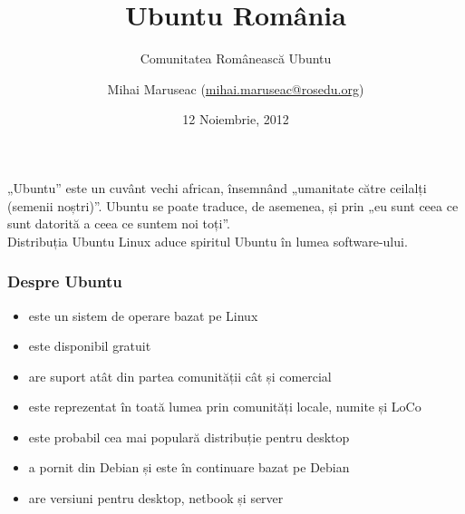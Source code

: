 \documentclass[compress]{beamer}
\title{Ubuntu România}
\subtitle{Comunitatea Românească Ubuntu}
\author{Mihai Maruseac (\href{mailto:mihai.maruseac@rosedu.org}{mihai.maruseac@rosedu.org})}
\date{12 Noiembrie, 2012}
\institute{Programatica 2012, București, România}
\begin{document}
\maketitle


\begin{frame}
  \begin{center}
    \large
    „Ubuntu” este un cuvânt vechi african,
    însemnând „umanitate către ceilalți (semenii noștri)”.
    Ubuntu se poate traduce, de asemenea, și prin
    „eu sunt ceea ce sunt datorită a ceea ce suntem noi toți”.
    \\
    Distribuția Ubuntu Linux aduce spiritul Ubuntu în lumea software-ului.
  \end{center}
\end{frame}

\begin{frame}
\frametitle{Despre Ubuntu}

\begin{itemize}[<+->]
  \item este un sistem de operare bazat pe Linux
  \item este disponibil gratuit
  \item are suport atât din partea comunității cât și comercial
  \item este reprezentat în toată lumea prin comunități locale, numite și LoCo
  \item este probabil cea mai populară distribuție pentru desktop
  \item a pornit din Debian și este în continuare bazat pe Debian
  \item are versiuni pentru desktop, netbook și server
\end{itemize}
\end{frame}
\end{document}
